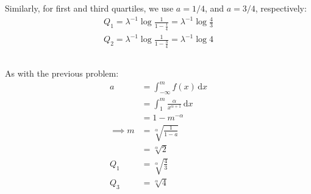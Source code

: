 \documentclass[twocolumn]{article}
\newcommand{\intg}[4]{\int_{#1}^{#2} \! #3 \, \mathrm{d}#4}
\begin{document}
Similarly, for first and third quartiles, we use $a=1/4$, and $a=3/4$, respectively:\begin{align*}
Q_1=\lambda^{-1}\log\frac{1}{1-\frac{1}{4}}=\lambda^{-1}\log\frac{4}{3}\\
Q_2=\lambda^{-1}\log\frac{1}{1-\frac{3}{4}}=\lambda^{-1}\log 4
\end{align*}

\subsection{}
As with the previous problem:\begin{align*}
a	& = \intg{-\infty}{m}{f(x)}{x}	\\
	&= \intg{1}{m}{\frac{\alpha }{x^{\alpha +1}}}{x} \\
	&= 1-m^{-\alpha}\\
\implies m &= \sqrt[\alpha]{\frac{1}{1-a}}\\
&= \sqrt[\alpha]{2} \\
Q_1 &= \sqrt[\alpha]{\frac{4}{3}}\\
Q_3 &= \sqrt[\alpha]{4}
\end{align*}
\end{document}
